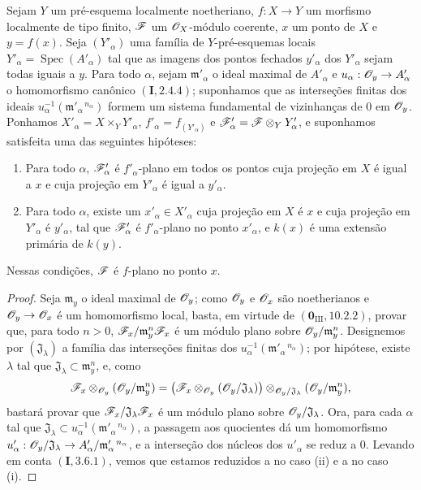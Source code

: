 \begin{theorem}[11.5.1]
\label{IV.11.5.1}
Sejam $Y$ um pré-esquema
localmente noetheriano,
$f:X\to Y$ um morfismo
localmente de tipo finito,
$\mathscr{F}$ um
$\mathscr{O}_X$-módulo coerente,
$x$ um ponto de $X$ e
$y=f(x)$. Seja
$(Y'_\alpha)$ uma família
de $Y$-pré-esquemas locais
$Y'_\alpha=\operatorname{Spec}(A'_\alpha)$
tal que as imagens dos
pontos fechados
$y'_\alpha$ dos
$Y'_\alpha$ sejam todas
iguais a $y$. Para todo
$\alpha$, sejam
$\mathfrak m'_\alpha$ o
ideal maximal de
$A'_\alpha$ e
$u_\alpha:\sh{O}_y\to
A'_\alpha$
o homomorfismo canônico
$(\mathbf I,2.4.4)$;
suponhamos que as
interseções finitas dos
ideais
$u_\alpha^{-1}(
\mathfrak m'_\alpha{}^{\,n_\alpha})$
formem um sistema
fundamental de vizinhanças
de $0$ em $\mathscr{O}_y$.
Ponhamos
$X'_\alpha=X\times_Y Y'_\alpha$,
$f'_\alpha=f_{(Y'_\alpha)}$
e $\mathscr{F}'_\alpha=
\mathscr{F}\otimes_Y Y'_\alpha$,
e suponhamos satisfeita
uma das seguintes hipóteses:
\begin{enumerate}[label=(\roman*)]
\item Para todo $\alpha$,
$\mathscr{F}'_\alpha$ é
$f'_\alpha$-plano em todos
os pontos cuja projeção
em $X$ é igual a $x$ e
cuja projeção em
$Y'_\alpha$ é igual a
$y'_\alpha$.
\item Para todo $\alpha$,
existe um
$x'_\alpha\in X'_\alpha$
cuja projeção em $X$ é
$x$ e cuja projeção em
$Y'_\alpha$ é
$y'_\alpha$, tal que
$\mathscr{F}'_\alpha$ é
$f'_\alpha$-plano no ponto
$x'_\alpha$, e $k(x)$
é uma extensão primária
de $k(y)$.
\end{enumerate}
Nessas condições,
$\mathscr{F}$ é $f$-plano no
ponto $x$.
\end{theorem}

\begin{proof}
Seja $\mathfrak m_y$ o
ideal maximal de
$\mathscr{O}_y$; como
$\mathscr{O}_y$ e $\mathscr{O}_x$
são noetherianos e
$\sh{O}_y\to\sh{O}_x$ é
um homomorfismo local,
basta, em virtude de
$(\mathbf{0}_{\mathrm{III}},
10.2.2)$, provar que,
para todo $n>0$,
$\mathscr{F}_x/\mathfrak m_y^n
\mathscr{F}_x$ é um módulo
plano sobre
$\mathscr{O}_y/\mathfrak m_y^n$.
Designemos por
$(\mathfrak J_\lambda)$
a família das interseções
finitas dos
$u_\alpha^{-1}(
\mathfrak m'_\alpha{}^{\,n_\alpha})$;
por hipótese, existe
$\lambda$ tal que
$\mathfrak J_\lambda\subset
\mathfrak m_y^n$, e, como
\[
\mathscr{F}_x\otimes_{\mathscr{O}_y}
(\mathscr{O}_y/\mathfrak m_y^n)
=\bigl(\mathscr{F}_x
\otimes_{\mathscr{O}_y}
(\mathscr{O}_y/\mathfrak J_\lambda)\bigr)
\otimes_{\mathscr{O}_y/\mathfrak J_\lambda}
(\mathscr{O}_y/\mathfrak m_y^n),
\]
bastará provar que
$\mathscr{F}_x/\mathfrak J_\lambda
\mathscr{F}_x$ é um módulo
plano sobre
$\mathscr{O}_y/\mathfrak J_\lambda$.
Ora, para cada $\alpha$
tal que
$\mathfrak J_\lambda\subset
u_\alpha^{-1}(
\mathfrak m'_\alpha{}^{\,n_\alpha})$,
a passagem aos quocientes
dá um homomorfismo
$u'_\alpha:
\sh{O}_y/\mathfrak J_\lambda
\to A'_\alpha/
\mathfrak m'_\alpha{}^{\,n_\alpha}$,
e a interseção dos núcleos
dos $u'_\alpha$ se reduz
a $0$. Levando em conta
$(\mathbf I,3.6.1)$, vemos
que estamos reduzidos a
 no caso
(ii) e a
 no caso
(i).
\end{proof}


